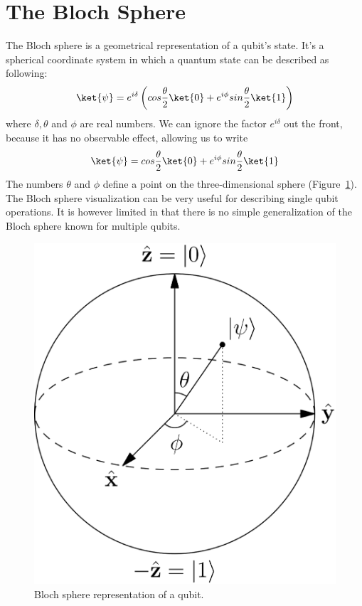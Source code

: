 \documentclass[11pt, notitlepage]{report}
\begin{document}
\section{The Bloch Sphere}
The Bloch sphere is a geometrical representation of a qubit's state. It's a spherical coordinate system in which a quantum state can be described as following:
\[
  \ket{\psi} = e^{i\delta} \left(cos\dfrac{\theta}{2}\ket{0} + e^{i\phi}sin\dfrac{\theta}{2}\ket{1}\right)
\]
where $\delta, \theta$ and $\phi$ are real numbers. We can ignore the factor $e^{i\delta}$ out the front, because it has no observable effect, allowing us to write
\[
  \ket{\psi} = cos\dfrac{\theta}{2}\ket{0} + e^{i\phi}sin\dfrac{\theta}{2}\ket{1}
\]
The numbers $\theta$ and $\phi$ define a point on the three-dimensional sphere (Figure~\ref{fig:bloch}). The Bloch sphere visualization can be very useful for describing single qubit operations. It is however limited in that there is no simple generalization of the Bloch sphere known for multiple qubits.
\begin{figure}[ht]
  \centering
  \includegraphics[scale=0.2]{images/bloch_sphere.eps}
  \caption{Bloch sphere representation of a qubit.}
  \label{fig:bloch}
\end{figure}
\par
\newpage
\end{document}
